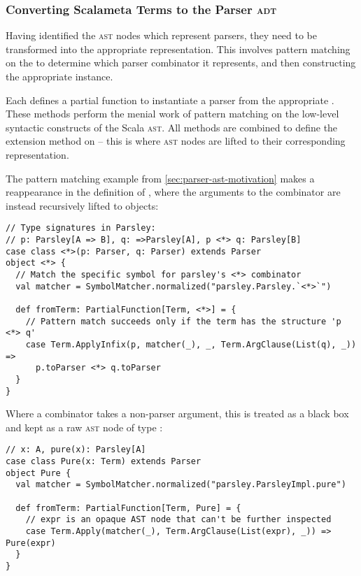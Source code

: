 \documentclass[../../main.tex]{subfiles}
\begin{document}

\subsubsection{Converting Scalameta Terms to the Parser \textsc{adt}}
Having identified the \textsc{ast} nodes which represent parsers, they need to be transformed into the appropriate  representation.
This involves pattern matching on the  to determine which parser combinator it represents, and then constructing the appropriate  instance.

Each  defines a partial function  to instantiate a parser from the appropriate .
These  methods perform the menial work of pattern matching on the low-level syntactic constructs of the Scala \textsc{ast}.
All  methods are combined to define the  extension method on  -- this is where \textsc{ast} nodes are lifted to their corresponding  representation.

The pattern matching example from \cref{sec:parser-ast-motivation} makes a reappearance in the definition of , where the arguments to the \scala{<*>} combinator are instead recursively lifted to  objects:
\begin{verbatim}
// Type signatures in Parsley:
// p: Parsley[A => B], q: =>Parsley[A], p <*> q: Parsley[B]
case class <*>(p: Parser, q: Parser) extends Parser
object <*> {
  // Match the specific symbol for parsley's <*> combinator
  val matcher = SymbolMatcher.normalized("parsley.Parsley.`<*>`")

  def fromTerm: PartialFunction[Term, <*>] = {
    // Pattern match succeeds only if the term has the structure 'p <*> q'
    case Term.ApplyInfix(p, matcher(_), _, Term.ArgClause(List(q), _)) =>
      p.toParser <*> q.toParser
  }
}
\end{verbatim}
%
Where a combinator takes a non-parser argument, this is treated as a black box and kept as a raw \textsc{ast} node of type :
\begin{verbatim}
// x: A, pure(x): Parsley[A]
case class Pure(x: Term) extends Parser
object Pure {
  val matcher = SymbolMatcher.normalized("parsley.ParsleyImpl.pure")

  def fromTerm: PartialFunction[Term, Pure] = {
    // expr is an opaque AST node that can't be further inspected
    case Term.Apply(matcher(_), Term.ArgClause(List(expr), _)) => Pure(expr)
  }
}
\end{verbatim}
\end{document}
